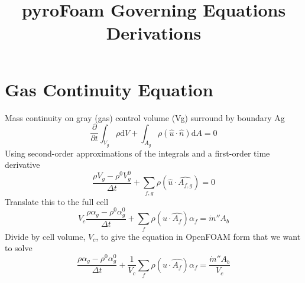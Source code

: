 \documentclass{article}
\title{pyroFoam Governing Equations Derivations}
\renewcommand{\vec}[1]{\ensuremath{\hat{#1}}}
\renewcommand{\d}{\mathrm{d}}
\begin{document}
  \section{Gas Continuity Equation}
    Mass continuity on gray (gas) control volume (Vg) surround by boundary Ag
    \begin{equation*}
        \frac{\partial}{\partial t}\int_{V_g} \rho \d V 
      + \int_{A_g} \rho (\vec{u} \cdot \vec{n}) \d A
      = 0
    \end{equation*}
    Using second-order approximations of the integrals and a first-order time derivative
    \begin{equation*}
        \frac{\rho V_g - \rho^0 V_g^0}{\Delta t}
      + \sum_{f,g}\rho(\vec{u}\cdot\vec{A_{f,g}})
      = 0
    \end{equation*}
    Translate this to the full cell
    \begin{equation*}
        V_c\frac{\rho \alpha_g - \rho^0 \alpha_g^0}{\Delta t}
      + \sum_{f}\rho(\vec{u}\cdot\vec{A_{f}})\alpha_f
      = \dot{m}'' A_b
    \end{equation*}
    Divide by cell volume, $V_c$, to give the equation in OpenFOAM form that we want to solve
    \begin{equation}
      \label{eq:gasCont}
      \boxed{
        \frac{\rho \alpha_g - \rho^0 \alpha_g^0}{\Delta t}
      + \frac{1}{V_c}\sum_{f}\rho (\vec{u}\cdot\vec{A_{f}})\alpha_f
      = \frac{\dot{m}'' A_b}{V_c}
      }
    \end{equation}
\end{document}
